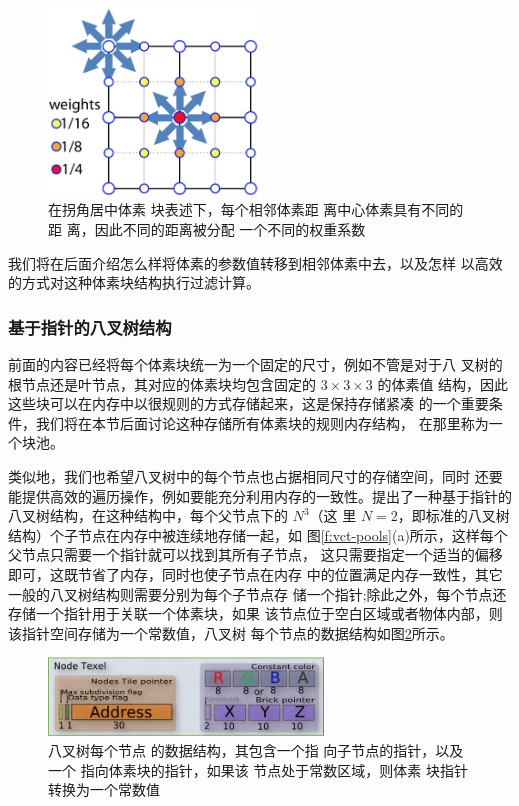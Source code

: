 \begin{figure}
	\sidecaption
	\includegraphics[width=0.5\textwidth]{figures/vct/vct-mipmapping}
	\caption{在拐角居中体素 块表述下，每个相邻体素距 离中心体素具有不同的距 离，因此不同的距离被分配 一个不同的权重系数}
	\label{f:vct-mipmapping}
\end{figure}

我们将在后面介绍怎么样将体素的参数值转移到相邻体素中去，以及怎样 以高效的方式对这种体素块结构执行过滤计算。



\subsubsection{基于指针的八叉树结构}
前面的内容已经将每个体素块统一为一个固定的尺寸，例如不管是对于八 叉树的根节点还是叶节点，其对应的体素块均包含固定的 $3\times  3\times  3$ 的体素值 结构，因此这些块可以在内存中以很规则的方式存储起来，这是保持存储紧凑 的一个重要条件，我们将在本节后面讨论这种存储所有体素块的规则内存结构， 在那里称为一个块池。

类似地，我们也希望八叉树中的每个节点也占据相同尺寸的存储空间，同时 还要能提供高效的遍历操作，例如要能充分利用内存的一致性。\cite{a:Gigavoxels:Avoxelbasedrenderingpipelineforefficientexplorationoflargeanddetailedscenes}提出了一种基于指针的八叉树结构，在这种结构中，每个父节点下的 $N^{3}$（这 里 $N = 2$，即标准的八叉树结构）个子节点在内存中被连续地存储一起，如 图\ref{f:vct-pools}(a)所示，这样每个父节点只需要一个指针就可以找到其所有子节点， 这只需要指定一个适当的偏移即可，这既节省了内存，同时也使子节点在内存 中的位置满足内存一致性，其它一般的八叉树结构则需要分别为每个子节点存 储一个指针;除此之外，每个节点还存储一个指针用于关联一个体素块，如果 该节点位于空白区域或者物体内部，则该指针空间存储为一个常数值，八叉树 每个节点的数据结构如图\ref{f:vct-node-texel}所示。

\begin{figure}
	\sidecaption
	\includegraphics[width=0.65\textwidth]{figures/vct/vct-node-texel}
	\caption{八叉树每个节点 的数据结构，其包含一个指 向子节点的指针，以及一个 指向体素块的指针，如果该 节点处于常数区域，则体素 块指针转换为一个常数值}
	\label{f:vct-node-texel}
\end{figure}

